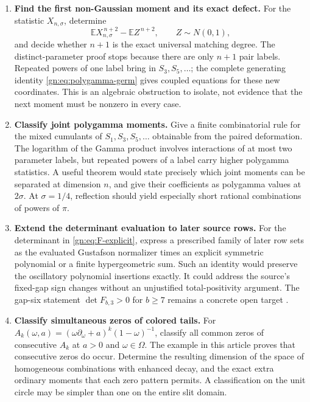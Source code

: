 \documentclass[11pt,a4paper]{article}
\numberwithin{equation}{section}
\theoremstyle{definition}
\theoremstyle{remark}
\begin{document}
\begin{enumerate}[label=\textbf{Q\arabic*.},leftmargin=*]

\item \textbf{Find the first non-Gaussian moment and its exact defect.}
For the statistic $X_{n,\sigma}$, determine
\[
 \mathbb E X_{n,\sigma}^{\,n+2}
       -\mathbb E Z^{\,n+2},\qquad Z\sim N(0,1),
\]
and decide whether $n+1$ is the exact universal matching degree.
The distinct-parameter proof stops because there are only
$n+1$ pair labels. Repeated powers of one label bring in
$S_3,S_5,\ldots$; the complete generating identity
\eqref{gn:eq:polygamma-germ} gives coupled equations for these
new coordinates. This is an algebraic obstruction to isolate,
not evidence that the next moment must be nonzero in every case.

\item \textbf{Classify joint polygamma moments.}
Give a finite combinatorial rule for the mixed cumulants of
$S_1,S_3,S_5,\ldots$ obtainable from the paired deformation.
The logarithm of the Gamma product involves interactions of at
most two parameter labels, but repeated powers of a label carry
higher polygamma statistics. A useful theorem would state
precisely which joint moments can be separated at dimension $n$,
and give their coefficients as polygamma values at $2\sigma$.
At $\sigma=1/4$, reflection should yield especially short
rational combinations of powers of $\pi$.

\item \textbf{Extend the determinant evaluation to later source rows.}
For the determinant in \eqref{gn:eq:F-explicit}, express a
prescribed family of later row sets as the evaluated Gustafson
normalizer times an explicit symmetric polynomial or a finite
hypergeometric sum. Such an identity would preserve the
oscillatory polynomial insertions exactly. It could address
the source's fixed-gap sign changes without an unjustified
total-positivity argument. The gap-six statement
$\det F_{b,3}>0$ for $b\ge7$ remains a concrete open target
\cite{repoordered}.

\item \textbf{Classify simultaneous zeros of colored tails.}
For
$A_k(\omega,a)=(\omega\partial_\omega+a)^k(1-\omega)^{-1}$,
classify all common zeros of consecutive $A_k$ at $a>0$ and
$\omega\in\Omega$. The example in this article proves that
consecutive zeros do occur. Determine the resulting dimension
of the space of homogeneous combinations with enhanced decay,
and the exact extra ordinary moments that each zero pattern
permits. A classification on the unit circle may be simpler
than one on the entire slit domain.


\end{enumerate}
\end{document}

